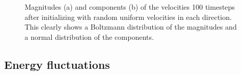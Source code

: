 \documentclass[reprint,floatfix,amsmath,amssymb,aps,pra]{revtex4-1}
\begin{document}
\begin{figure}
    \centering
     \label{fig:velocity-magnitudes}
     \label{fig:velocity-magnitudes}
    \caption{Magnitudes (a) and components (b) of the velocities 100 timesteps after initializing with random uniform velocities in each direction. This clearly shows a Boltzmann distribution of the magnitudes and a normal distribution of the components.}
    \label{fig:velocity-evolution}
\end{figure}

\subsection{Energy fluctuations}
\end{document}
